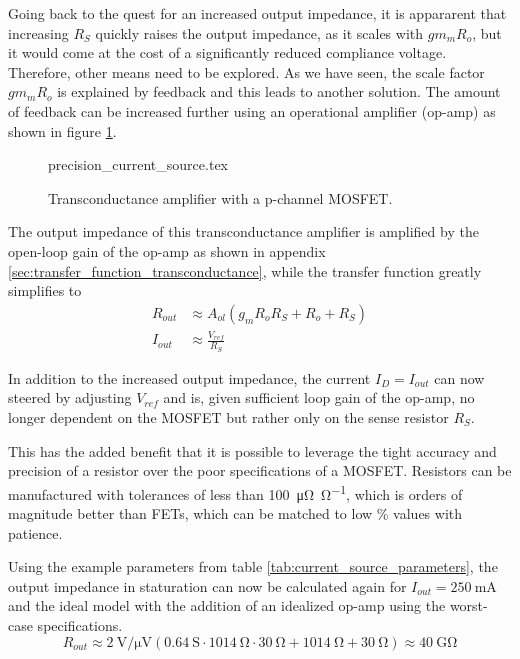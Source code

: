 Going back to the quest for an increased output impedance, it is appararent that increasing $R_S$ quickly raises the output impedance, as it scales with $gm_m R_o$, but it would come at the cost of a significantly reduced compliance voltage. Therefore, other means need to be explored. As we have seen, the scale factor $gm_m R_o$ is explained by feedback and this leads to another solution. The amount of feedback can be increased further using an operational amplifier (op-amp) as shown in figure \ref{fig:precision_current_source}.

\begin{figure}[ht]
    \centering
    {precision_current_source.tex}
    \caption{Transconductance amplifier with a p-channel MOSFET.}
    \label{fig:precision_current_source}
\end{figure}

The output impedance of this transconductance amplifier is amplified by the open-loop gain of the op-amp as shown in appendix \ref{sec:transfer_function_transconductance}, while the transfer function greatly simplifies to
\begin{align}
    R_{out} &\approx A_{ol} \left(g_m R_o R_S + R_o + R_S \right) \nonumber\\
    I_{out} &\approx \frac{V_{ref}}{R_S} \label{eqn:current_source_transfer_function}
\end{align}

In addition to the increased output impedance, the current $I_D = I_{out}$ can now steered by adjusting $V_{ref}$ and is, given sufficient loop gain of the op-amp, no longer dependent on the MOSFET but rather only on the sense resistor $R_S$.

This has the added benefit that it is possible to leverage the tight accuracy and precision of a resistor over the poor specifications of a MOSFET. Resistors can be manufactured with tolerances of less than \qty{100}{\micro \ohm \per \ohm}, which is orders of magnitude better than FETs, which can be matched to low \unit{\percent} values with patience.

Using the example parameters from table \ref{tab:current_source_parameters}, the output impedance in staturation can now be calculated again for $I_{out}=\qty{250}{\mA}$ and the ideal  model with the addition of an idealized  op-amp using the worst-case specifications.
\begin{equation}
    R_{out} \approx \qty[per-mode=power]{2}{\volt \per \uV} \left(\qty{0.64}{\siemens}\cdot \qty{1014}{\ohm} \cdot \qty{30}{\ohm} + \qty{1014}{\ohm} + \qty{30}{\ohm} \right) \approx \qty{40}{\giga\ohm} \label{eqn:current_source_output_impedance}
\end{equation}

